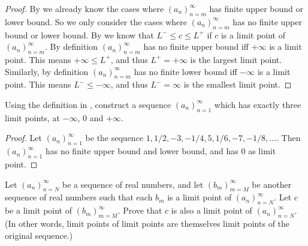 \begin{proof}
  By  we already know the cases where \((a_n)_{n = m}^\infty\) has finite upper bound or lower bound.
  So we only consider the cases where \((a_n)_{n = m}^\infty\) has no finite upper bound or lower bound.
  By  we know that \(L^- \leq c \leq L^+\) if \(c\) is a limit point of \((a_n)_{n = m}^\infty\).
  By definition \((a_n)_{n = m}^\infty\) has no finite upper bound iff \(+\infty\) is a limit point.
  This means \(+\infty \leq L^+\), and thus \(L^+ = +\infty\) is the largest limit point.
  Similarly, by definition \((a_n)_{n = m}^\infty\) has no finite lower bound iff \(-\infty\) is a limit point.
  This means \(L^- \leq -\infty\), and thus \(L^- = \infty\) is the smallest limit point.
\end{proof}

\begin{ex}\label{i:ex:6.4.9}
  Using the definition in , construct a sequence \((a_n)_{n = 1}^\infty\) which has exactly three limit points, at \(-\infty\), \(0\) and \(+\infty\).
\end{ex}

\begin{proof}
  Let \((a_n)_{n = 1}^\infty\) be the sequence \(1, 1/2, -3, -1/4, 5, 1/6, -7, -1/8, \dots\).
  Then \((a_n)_{n = 1}^\infty\) has no finite upper bound and lower bound, and has \(0\) as limit point.
\end{proof}

\begin{ex}\label{i:ex:6.4.10}
  Let \((a_n)_{n = N}^\infty\) be a sequence of real numbers, and let \((b_m)_{m = M}^\infty\) be another sequence of real numbers such that each \(b_m\) is a limit point of \((a_n)_{n = N}^\infty\).
  Let \(c\) be a limit point of \((b_m)_{m = M}^\infty\).
  Prove that \(c\) is also a limit point of \((a_n)_{n = N}^\infty\).
  (In other words, limit points of limit points are themselves limit points of the original sequence.)
\end{ex}


